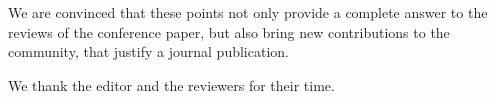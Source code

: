 \documentclass[a4paper]{article}
\begin{document}
We are convinced that these points not only provide a complete answer to
the reviews of the conference paper, but also bring new contributions to
the community, that justify a journal publication.


We thank the editor and the reviewers for their time.



\end{document}

